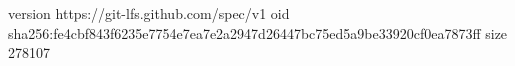 version https://git-lfs.github.com/spec/v1
oid sha256:fe4cbf843f6235e7754e7ea7e2a2947d26447bc75ed5a9be33920cf0ea7873ff
size 278107
